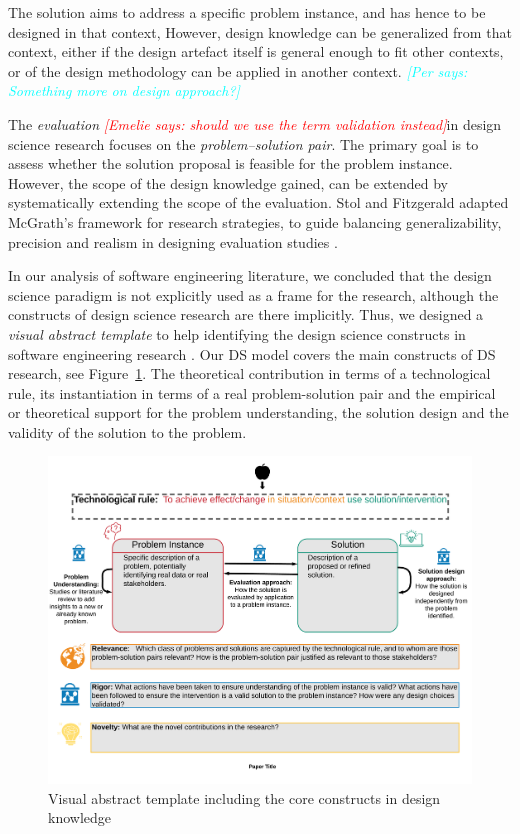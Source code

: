 \documentclass[graybox]{svmult}
\newcommand{\emelie}[1]{\textcolor{red}{{\it [Emelie says: #1]}}}
\newcommand{\per}[1]{\textcolor{cyan}{{\it [Per says: #1]}}}
\newcommand{\emelie}[1]{}
\newcommand{\per}[1]{}
\begin{document}
The solution aims to address a specific problem instance, and has hence to be designed in that context, However, design knowledge can be generalized from that context, either if the design artefact itself is general enough to fit other contexts, or of the design methodology can be applied in another context.
\per{Something more on design approach?}

The \emph{evaluation} \emelie{should we use the term validation instead}in design science research focuses on the \emph{problem--solution pair}. The primary goal is to assess whether the solution proposal is feasible for the problem instance. However, the scope of the design knowledge gained, can be extended by systematically extending the scope of the evaluation.  Stol and Fitzgerald adapted McGrath's framework for research strategies, to guide balancing generalizability, precision and realism in designing evaluation studies \cite{StolABC18}.


In our analysis of software engineering literature, we concluded that the design science paradigm is not explicitly used as a frame for the research, although the constructs of design science research are there implicitly. Thus, we designed a \emph{visual abstract template} to help identifying the design science constructs in software engineering research \cite{StoreyESEM17}. 
Our DS model covers the main constructs of DS research, see Figure~\ref{fig:VA-template}. The theoretical contribution in terms of a technological rule, its instantiation in terms of a real problem-solution pair and the empirical or theoretical support for the problem understanding, the solution design and the validity of the solution to the problem.
\begin{figure}
  \includegraphics[width=1.0\textwidth]{Figures/GenericVA.png}
\caption{Visual abstract template including the core constructs in design knowledge}
\label{fig:VA-template}       %
\end{figure}
\end{document}
